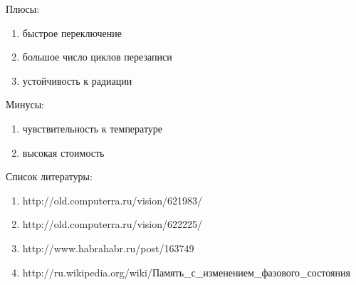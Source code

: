 \hspace{-5ex}\begin{minipage}[h]{0.5\linewidth}
\vspace{4ex}Плюсы:
\begin{enumerate}[noitemsep]
	\item быстрое переключение
	\item большое число циклов перезаписи
	\item устойчивость к радиации
\end{enumerate}
\end{minipage}
\begin{minipage}[h]{0.5\linewidth}
Минусы:
\begin{enumerate}[noitemsep]
	\item чувствительность к температуре
	\item высокая стоимость
\end{enumerate}
\end{minipage}

\pagebreak

Список литературы:
\vspace{-2ex}\begin{enumerate}[noitemsep]
	\item http://old.computerra.ru/vision/621983/
	\item http://old.computerra.ru/vision/622225/
	\item http://www.habrahabr.ru/post/163749
    \item http://ru.wikipedia.org/wiki/Память\_с\_изменением\_фазового\_состояния
\end{enumerate} 


